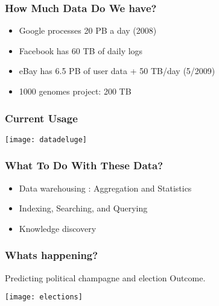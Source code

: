 \begin{frame}[fragile]\frametitle{How Much Data Do We have?}
\begin{itemize}
\item Google processes 20 PB a day (2008)
\item Facebook has 60 TB of daily logs
\item eBay has 6.5 PB of user data + 50 TB/day (5/2009)
\item 1000 genomes project: 200 TB
\end{itemize}
\end{frame}

\begin{frame}[fragile]\frametitle{Current Usage}
\begin{center}
\texttt{[image: datadeluge]}
\end{center}
\end{frame}

\begin{frame}[fragile]\frametitle{What To Do With These Data?}
\begin{itemize}
\item Data warehousing : Aggregation and Statistics 
\item Indexing, Searching, and Querying
\item Knowledge discovery
\end{itemize}
\end{frame}

%


\begin{frame}[fragile]\frametitle{Whats happening?}
Predicting political champagne and election Outcome.
\begin{center}
\texttt{[image: elections]}
\end{center}
\end{frame}

